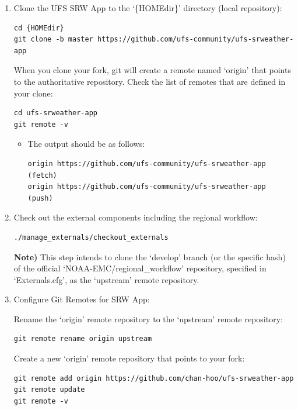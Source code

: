 \documentclass[11pt,fleqn]{report}              %
\begin{document}
\begin{enumerate}

\item Clone the UFS SRW App to the `\{HOMEdir\}' directory (local repository):

\lstset{language=bash}   
\begin{lstlisting}[frame=trBL]
cd {HOMEdir}
git clone -b master https://github.com/ufs-community/ufs-srweather-app
\end{lstlisting}

When you clone your fork, git will create a remote named `origin' that points to the authoritative repository. Check the list of remotes that are defined in your clone:
\lstset{language=bash}   
\begin{lstlisting}[frame=trBL]
cd ufs-srweather-app
git remote -v
\end{lstlisting}

\begin{itemize}
\item The output should be as follows:
\lstset{language=bash}   
\begin{lstlisting}[frame=trBL]
origin https://github.com/ufs-community/ufs-srweather-app (fetch)
origin https://github.com/ufs-community/ufs-srweather-app (push)
\end{lstlisting}
\end{itemize}

\item Check out the external components including the regional workflow:
\lstset{language=bash}   
\begin{lstlisting}[frame=trBL]
./manage_externals/checkout_externals
\end{lstlisting}

{\bf Note)} This step intends to clone the `develop' branch (or the specific hash) of the official `NOAA-EMC/regional\_workflow' repository, specified in `Externals.cfg', as the `upstream' remote repository.


\item Configure Git Remotes for SRW App:

Rename the `origin' remote repository to the `upstream' remote repository:
\lstset{language=bash}   
\begin{lstlisting}[frame=trBL]
git remote rename origin upstream
\end{lstlisting}

Create a new `origin' remote repository that points to your fork:
\lstset{language=bash}   
\begin{lstlisting}[frame=trBL]
git remote add origin https://github.com/chan-hoo/ufs-srweather-app
git remote update
git remote -v
\end{lstlisting}


\end{enumerate}
\end{document}
